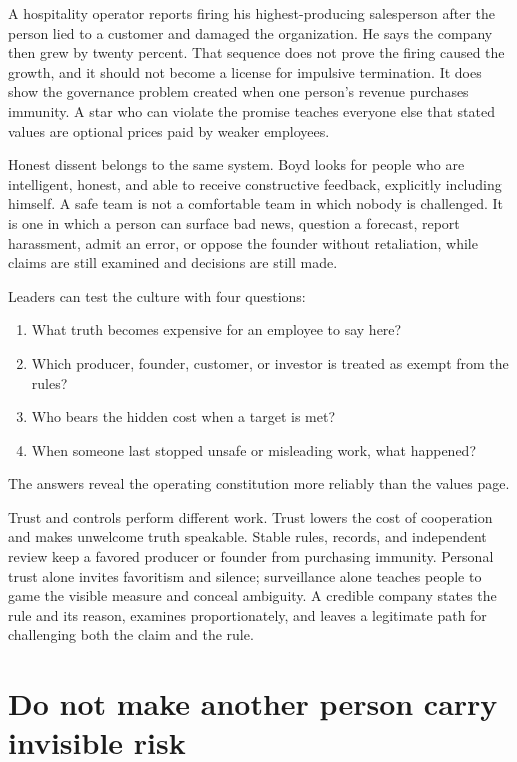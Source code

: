 A hospitality operator reports firing his highest-producing salesperson after
the person lied to a customer and damaged the organization. He says the company
then grew by twenty percent. That sequence does not prove the firing caused
the growth, and it should not become a license for impulsive termination. It
does show the governance problem created when one person's revenue purchases
immunity. A star who can violate the promise teaches everyone else that stated
values are optional prices paid by weaker employees.

Honest dissent belongs to the same system. Boyd looks for people who are
intelligent, honest, and able to receive constructive feedback, explicitly
including himself. A safe team is not a comfortable team in which nobody is
challenged. It is one in which a person can surface bad news, question a
forecast, report harassment, admit an error, or oppose the founder without
retaliation, while claims are still examined and decisions are still made.

Leaders can test the culture with four questions:

\begin{enumerate}[itemsep=0.14em]
\item What truth becomes expensive for an employee to say here?
\item Which producer, founder, customer, or investor is treated as exempt from
  the rules?
\item Who bears the hidden cost when a target is met?
\item When someone last stopped unsafe or misleading work, what happened?
\end{enumerate}

The answers reveal the operating constitution more reliably than the values
page.

Trust and controls perform different work. Trust lowers the cost of
cooperation and makes unwelcome truth speakable. Stable rules, records, and
independent review keep a favored producer or founder from purchasing
immunity. Personal trust alone invites favoritism and silence; surveillance
alone teaches people to game the visible measure and conceal ambiguity. A
credible company states the rule and its reason, examines proportionately, and
leaves a legitimate path for challenging both the claim and the rule.

\section{Do not make another person carry invisible risk}

